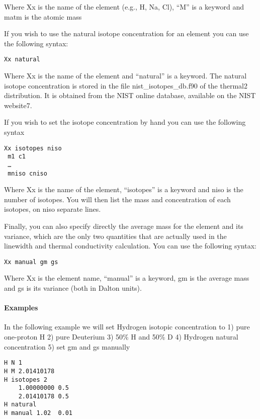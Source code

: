 \documentclass[
]{article}
\begin{document}
Where Xx is the name of the element (e.g., H, Na, Cl), \enquote{M} is a
keyword and matm is the atomic mass

If you wish to use the natural isotope concentration for an element you
can use the following syntax:

\begin{verbatim}
Xx natural
\end{verbatim}

Where Xx is the name of the element and \enquote{natural} is a keyword.
The natural isotope concentration is stored in the file
nist\_isotopes\_db.f90 of the thermal2 distribution. It is obtained from
the NIST online database, available on the NIST website7.

If you wish to set the isotope concentration by hand you can use the
following syntax

\begin{verbatim}
Xx isotopes niso
 m1 c1
 …
 mniso cniso
\end{verbatim}

Where Xx is the name of the element, \enquote{isotopes} is a keyword and
niso is the number of isotopes. You will then list the mass and
concentration of each isotopes, on niso separate lines.

Finally, you can also specify directly the average mass for the element
and its variance, which are the only two quantities that are actually
used in the linewidth and thermal conductivity calculation. You can use
the following syntax:

\begin{verbatim}
Xx manual gm gs
\end{verbatim}

Where Xx is the element name, \enquote{manual} is a keyword, gm is the
average mass and gs is its variance (both in Dalton units).

\hypertarget{examples-2}{%
\paragraph{Examples}\label{examples-2}}

In the following example we will set Hydrogen isotopic concentration to
1) pure one-proton H 2) pure Deuterium 3) 50\% H and 50\% D 4) Hydrogen
natural concentration 5) set gm and gs manually

\begin{verbatim}
H N 1
H M 2.01410178
H isotopes 2
    1.00000000 0.5
    2.01410178 0.5
H natural
H manual 1.02  0.01
\end{verbatim}
\end{document}

